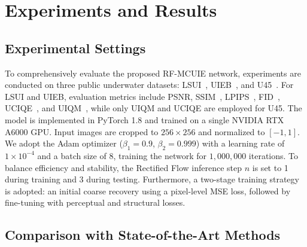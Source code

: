 \section{Experiments and Results}
\label{sec:experiments}
\subsection{Experimental Settings}
\newcommand{\best}[1]{\textcolor{red}{#1}}
\newcommand{\second}[1]{\textcolor{blue}{#1}}

To comprehensively evaluate the proposed RF-MCUIE network, experiments are conducted on three public underwater datasets: LSUI~\cite{r7}, UIEB~\cite{r18}, and U45~\cite{r53}.  For LSUI and UIEB, evaluation metrics include PSNR, SSIM~\cite{r31}, LPIPS~\cite{r34}, FID~\cite{r35}, UCIQE~\cite{r36}, and UIQM~\cite{r37}, while only UIQM and UCIQE are employed for U45. The model is implemented in PyTorch 1.8 \cite{r38} and trained on a single NVIDIA RTX A6000 GPU. Input images are cropped to $256 \times 256$ and normalized to $[-1, 1]$. We adopt the Adam optimizer \cite{r39} ($\beta_1=0.9$, $\beta_2=0.999$) with a learning rate of $1 \times 10^{-4}$ and a batch size of 8, training the network for $1,000,000$ iterations. To balance efficiency and stability, the Rectified Flow inference step $n$ is set to 1 during training and 3 during testing. Furthermore, a two-stage training strategy is adopted: an initial coarse recovery using a pixel-level MSE loss, followed by fine-tuning with perceptual and structural losses.

\subsection{Comparison with State-of-the-Art Methods}


